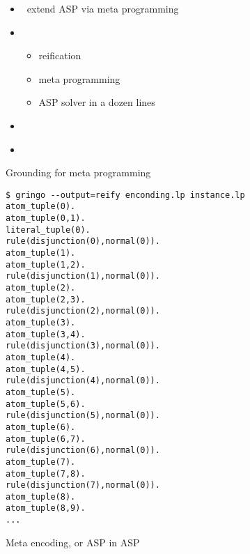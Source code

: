 \begin{frame}{\metasp}
  \begin{itemize}
  \item {} \ extend ASP via meta programming
  \item {} \
    \begin{itemize}
    \item reification
    \item meta programming
    \item ASP solver in a dozen lines
    \end{itemize}
  \item {}   \ \cite{gekasc11b,karoscwa21a}
  \item {} \ \cite{brderosc15b,digelurosc18a}
  \end{itemize}
\end{frame}
\begin{frame}[fragile]{Grounding for meta programming}
\begin{adjustbox}{max totalsize={\textwidth}{.83\textheight},keepaspectratio}
\begin{lstlisting}
$ gringo --output=reify enconding.lp instance.lp
atom_tuple(0).
atom_tuple(0,1).
literal_tuple(0).
rule(disjunction(0),normal(0)).
atom_tuple(1).
atom_tuple(1,2).
rule(disjunction(1),normal(0)).
atom_tuple(2).
atom_tuple(2,3).
rule(disjunction(2),normal(0)).
atom_tuple(3).
atom_tuple(3,4).
rule(disjunction(3),normal(0)).
atom_tuple(4).
atom_tuple(4,5).
rule(disjunction(4),normal(0)).
atom_tuple(5).
atom_tuple(5,6).
rule(disjunction(5),normal(0)).
atom_tuple(6).
atom_tuple(6,7).
rule(disjunction(6),normal(0)).
atom_tuple(7).
atom_tuple(7,8).
rule(disjunction(7),normal(0)).
atom_tuple(8).
atom_tuple(8,9).
...
\end{lstlisting}
\end{adjustbox}
\end{frame}
\begin{frame}[fragile,shrink=34]{Meta encoding, or ASP in ASP}
  \bigskip
  
\end{frame}
%
